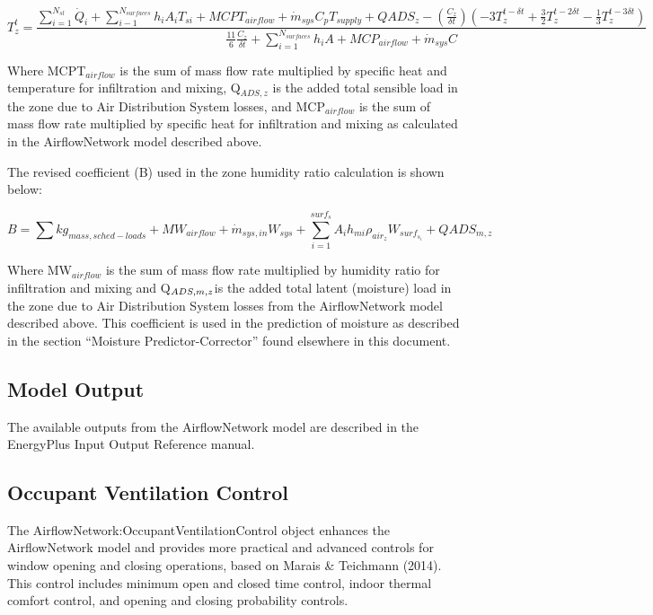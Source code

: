 {\scriptsize
\begin{equation}
T_z^t = \frac{\sum_{i=1}^{N_{sl}} \dot{Q}_i + \sum_{i-1}^{N_{surfaces}} h_i A_i T_{si} + MCPT_{airflow} + \dot{m}_{sys} C_p T_{supply} + QADS_z - \left( \frac{C_z}{\delta t} \right ) \left(-3 T_z^{t-\delta t} + \frac{3}{2} T_z^{t-2\delta t} -\frac{1}{3} T_z^{t-3\delta t} \right )}{\frac{11}{6} \frac{C_z}{\delta t} + \sum_{i=1}^{N_{surfaces}} h_i A + MCP_{airflow} + \dot{m}_{sys} C}
\end{equation}}

Where MCPT\(_{airflow}\) is the sum of mass flow rate multiplied by specific heat and temperature for infiltration and mixing, Q\(_{ADS,z}\) is the added total sensible load in the zone due to Air Distribution System losses, and MCP\(_{airflow}\) is the sum of mass flow rate multiplied by specific heat for infiltration and mixing as calculated in the AirflowNetwork model described above.

The revised coefficient (B) used in the zone humidity ratio calculation is shown below:

\begin{equation}
B = \sum kg_{mass,sched-loads} + MW_{airflow} + \dot{m}_{sys,in} W_{sys} + \sum_{i = 1}^{surf_s} A_i h_{mi} \rho_{air_z} W_{surf_{s_i}} + QADS_{m,z}
\end{equation}

Where MW\(_{airflow}\) is the sum of mass flow rate multiplied by humidity ratio for infiltration and mixing and Q\(_{ADS,m,z\\}\)is the added total latent (moisture) load in the zone due to Air Distribution System losses from the AirflowNetwork model described above. This coefficient is used in the prediction of moisture as described in the section ``Moisture Predictor-Corrector'' found elsewhere in this document.

\subsection{Model Output}\label{model-output}

The available outputs from the AirflowNetwork model are described in the EnergyPlus Input Output Reference manual.

\subsection{Occupant Ventilation Control}\label{occupant-ventilation-control}

The AirflowNetwork:OccupantVentilationControl object enhances the AirflowNetwork model and provides more practical and advanced controls for window opening and closing operations, based on Marais \& Teichmann (2014). This control includes minimum open and closed time control, indoor thermal comfort control, and opening and closing probability controls.


